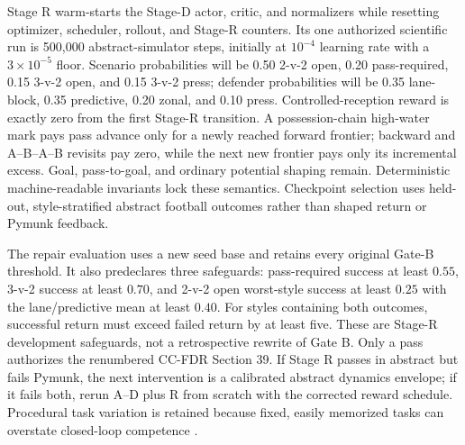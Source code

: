\documentclass[12pt,twocolumn]{article}
\begin{document}
Stage R warm-starts the Stage-D actor, critic, and normalizers while resetting optimizer,
scheduler, rollout, and Stage-R counters. Its one authorized scientific run is 500,000
abstract-simulator steps, initially at $10^{-4}$ learning rate with a
$3\times10^{-5}$ floor. Scenario probabilities will be 0.50 2-v-2 open, 0.20 pass-required,
0.15 3-v-2 open, and 0.15 3-v-2 press; defender probabilities will be 0.35 lane-block,
0.35 predictive, 0.20 zonal, and 0.10 press. Controlled-reception reward is exactly zero from the
first Stage-R transition. A possession-chain high-water mark pays pass advance only for a newly
reached forward frontier; backward and A--B--A--B revisits pay zero, while the next new frontier
pays only its incremental excess. Goal, pass-to-goal, and ordinary potential shaping remain.
Deterministic machine-readable invariants lock these semantics. Checkpoint selection uses
held-out, style-stratified abstract football outcomes rather than shaped return or Pymunk feedback.

The repair evaluation uses a new seed base and retains every original Gate-B threshold. It also
predeclares three safeguards: pass-required success at least $0.55$, 3-v-2 success at least
$0.70$, and 2-v-2 open worst-style success at least $0.25$ with the lane/predictive mean at least
$0.40$. For styles containing both outcomes, successful return must exceed failed return by at
least five. These are Stage-R development safeguards, not a retrospective rewrite of Gate B.
Only a pass authorizes the renumbered CC-FDR Section 39. If Stage R passes in abstract but fails Pymunk, the
next intervention is a calibrated abstract dynamics envelope; if it fails both, rerun A--D plus R
from scratch with the corrected reward schedule. Procedural task variation is retained because
fixed, easily memorized tasks can overstate closed-loop competence \cite{ellis2023smacv2}.
\end{document}
